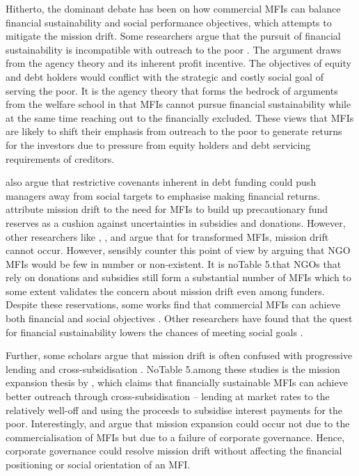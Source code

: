 \documentclass[a4paper, nobind]{templates/ociamthesis}
\begin{document}
Hitherto, the dominant debate has been on how commercial MFIs can balance financial sustainability and social performance objectives, which attempts to mitigate the mission drift. Some researchers argue that the pursuit of financial sustainability is incompatible with outreach to the poor \autocite{cobb2016funding,mia2017mission}. The argument draws from the agency theory and its inherent profit incentive. The objectives of equity and debt holders would conflict with the strategic and costly social goal of serving the poor. It is the agency theory that forms the bedrock of arguments from the welfare school in that MFIs cannot pursue financial sustainability while at the same time reaching out to the financially excluded. These views that MFIs are likely to shift their emphasis from outreach to the poor to generate returns for the investors due to pressure from equity holders and debt servicing requirements of creditors.

\textcite{mersland2019social} also argue that restrictive covenants inherent in debt funding could push managers away from social targets to emphasise making financial returns. \textcite{armendariz2013subsidy} attribute mission drift to the need for MFIs to build up precautionary fund reserves as a cushion against uncertainties in subsidies and donations. However, other researchers like \textcite{im2015profits}, \textcite{lutzenkirchen2012microfinance}, and \textcite{quayes2012depth} argue that for transformed MFIs, mission drift cannot occur. However, \textcite{morduch2019challenges} sensibly counter this point of view by arguing that NGO MFIs would be few in number or non-existent. It is noTable 5.that NGOs that rely on donations and subsidies still form a substantial number of MFIs \autocite{armendariz2013subsidy} which to some extent validates the concern about mission drift even among funders. Despite these reservations, some works find that commercial MFIs can achieve both financial and social objectives \autocite{kodongo2013individual}. Other researchers have found that the quest for financial sustainability lowers the chances of meeting social goals \autocite{hishigsuren2006transformation}.

Further, some scholars argue that mission drift is often confused with progressive lending and cross-subsidisation \autocite{abeysekera2014sustainability}. NoTable 5.among these studies is the mission expansion thesis by \textcite{mersland2010microfinance}, which claims that financially sustainable MFIs can achieve better outreach through cross-subsidisation -- lending at market rates to the relatively well-off and using the proceeds to subsidise interest payments for the poor. Interestingly, \textcite{campion1999institutional} and \textcite{ramus2017} argue that mission expansion could occur not due to the commercialisation of MFIs but due to a failure of corporate governance. Hence, corporate governance could resolve mission drift without affecting the financial positioning or social orientation of an MFI.
\end{document}
